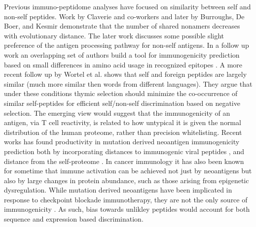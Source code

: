 \documentclass[superscriptaddress,twocolumn,pre]{revtex4}
\newcommand{\<}{\langle}
\renewcommand{\>}{\rangle}
\begin{document}
Previous immuno-peptidome analyses have focused on similarity between self and non-self peptides. Work by Claverie and co-workers \cite{Claverie1988} and later by Burroughs, De Boer, and Kesmir \cite{Burroughs2004} demonstrate that the number of shared nonamers decreases with evolutionary distance. The later work discusses some possible slight preference of the antigen processing pathway for non-self antigens. In a follow up work an overlapping set of authors build a tool for immunogenicity prediction based on small differences in amino acid usage in recognized epitopes \cite{Calis2013}. A more recent follow up by Wortel et al. \cite{Wortel2018} shows that self and foreign peptides are largely similar (much more similar then words from different languages). They argue that under these conditions thymic selection should minimize the co-occurrence of similar self-peptides for efficient self/non-self discrimination based on negative selection. The emerging view would suggest that the immunogenicity of an antigen, via T cell reactivity, is related to how untypical it is given the normal distribution of the human proteome, rather than precision whitelisting. Recent works has found productivity in mutation derived neoantigen immunogenicity prediction both by incorporating distances to immunogenic viral peptides \cite{Luksza}, and distance from the self-proteome \cite{Vonderheide}. In cancer immunology \cite{Walz2015} it has also been known for sometime that immune activation can be achieved not just by neoantigens but also by large changes in protein abundance, such as those arising from epigenetic dysregulation. While mutation derived neoantigens have been implicated in response to checkpoint blockade immunotherapy, they are not the only source of immunogenicity \cite{XXX}. As such, bias towards unlikley peptides would account for both sequence and expression based discrimination.
\end{document}
